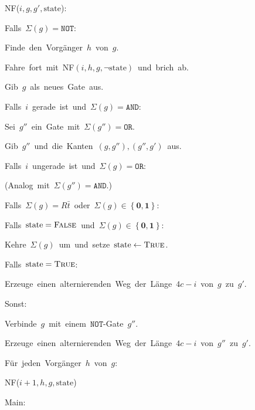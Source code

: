 \begin{algorithm}
\begin{lyxcode}
NF($i,g,g',\mathrm{state}$):~

\begin{lyxcode}
Falls~$\Sigma\left(g\right)=\mathtt{NOT}$:~

\begin{lyxcode}
Finde~den~Vorgänger~$h$~von~$g$.

Fahre~fort~mit~NF$\left(i,h,g,\neg\mathrm{state}\right)$~und~brich~ab.
\end{lyxcode}
Gib~$g$~als~neues~Gate~aus.

Falls~$i$~gerade~ist~und~$\Sigma\left(g\right)=\mathtt{AND}$:~

\begin{lyxcode}
Sei~$g''$~ein~Gate~mit~$\Sigma\left(g''\right)=\mathtt{OR}$.

Gib~$g''$~und~die~Kanten~$\left(g,g''\right),\left(g'',g'\right)$~aus.
\end{lyxcode}
Falls~$i$~ungerade~ist~und~$\Sigma\left(g\right)=\mathtt{OR}$:~

\begin{lyxcode}
(Analog~mit~$\Sigma\left(g''\right)=\mathtt{AND}$.)
\end{lyxcode}
Falls~$\Sigma\left(g\right)=R\bar{t}$~oder~$\Sigma\left(g\right)\in\left\{ \mathbf{0},\mathbf{1}\right\} $:~

\begin{lyxcode}
Falls~$\mathrm{state}=\textsc{False}$~und~$\Sigma\left(g\right)\in\left\{ \mathbf{0},\mathbf{1}\right\} $:~

\begin{lyxcode}
Kehre~$\Sigma\left(g\right)$~um~und~setze~$\mathrm{\mathrm{state}\leftarrow\textsc{True}}$.
\end{lyxcode}
Falls~$\mathrm{state}=\textsc{True}$:~

\begin{lyxcode}
Erzeuge~einen~alternierenden~Weg~der~Länge~$4c-i$~von~$g$~zu~$g'$.
\end{lyxcode}
Sonst:~

\begin{lyxcode}
Verbinde~$g$~mit~einem~$\mathtt{NOT}$-Gate~$g''$.

Erzeuge~einen~alternierenden~Weg~der~Länge~$4c-i$~von~$g''$~zu~$g'$.
\end{lyxcode}
\end{lyxcode}
Für~jeden~Vorgänger~$h$~von~$g$:~

\begin{lyxcode}
NF($i+1,h,g,\mathrm{state}$)
\end{lyxcode}
\end{lyxcode}
Main:~


\end{lyxcode}
\end{algorithm}
